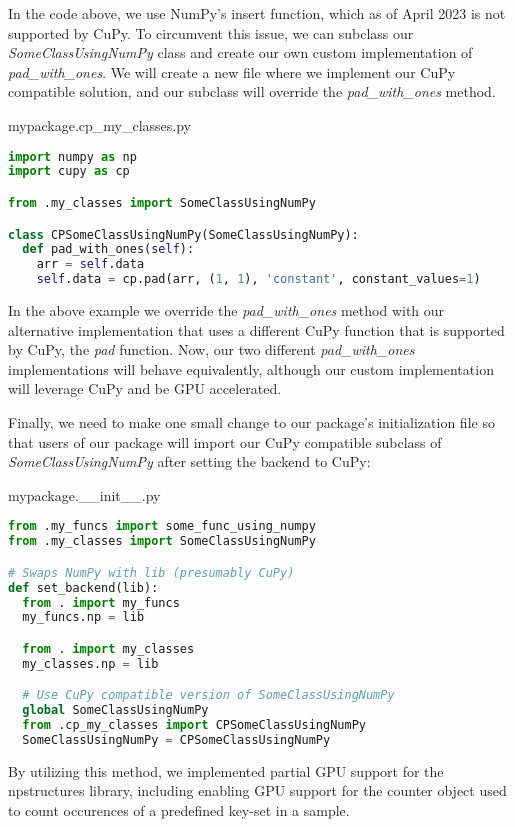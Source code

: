 In the code above, we use NumPy's insert function, which as of April 2023 is not supported by CuPy.
To circumvent this issue, we can subclass our \textit{SomeClassUsingNumPy} class and create our own custom implementation of \textit{pad\_with\_ones}.
We will create a new file where we implement our CuPy compatible solution, and our subclass will override the \textit{pad\_with\_ones} method.
\begin{center}
mypackage.cp\_my\_classes.py
\end{center}
\begin{lstlisting}[language=Python,style=pycode]
import numpy as np
import cupy as cp

from .my_classes import SomeClassUsingNumPy

class CPSomeClassUsingNumPy(SomeClassUsingNumPy):
  def pad_with_ones(self):
    arr = self.data
    self.data = cp.pad(arr, (1, 1), 'constant', constant_values=1)
\end{lstlisting}

In the above example we override the \textit{pad\_with\_ones} method with our alternative implementation that uses a different CuPy function that is supported by CuPy, the \textit{pad} function.
Now, our two different \textit{pad\_with\_ones} implementations will behave equivalently, although our custom implementation will leverage CuPy and be GPU accelerated.

Finally, we need to make one small change to our package's initialization file so that users of our package will import our CuPy compatible subclass of \textit{SomeClassUsingNumPy} after setting the backend to CuPy:
\begin{center}
mypackage.\_\_init\_\_.py
\end{center}
\begin{lstlisting}[language=Python,style=pycode]
from .my_funcs import some_func_using_numpy
from .my_classes import SomeClassUsingNumPy 

# Swaps NumPy with lib (presumably CuPy)
def set_backend(lib):
  from . import my_funcs
  my_funcs.np = lib

  from . import my_classes
  my_classes.np = lib

  # Use CuPy compatible version of SomeClassUsingNumPy
  global SomeClassUsingNumPy
  from .cp_my_classes import CPSomeClassUsingNumPy
  SomeClassUsingNumPy = CPSomeClassUsingNumPy
\end{lstlisting}

By utilizing this method, we implemented partial GPU support for the npstructures library, including enabling GPU support for the counter object used to count occurences of a predefined key-set in a sample.

